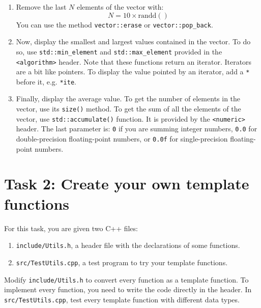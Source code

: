 \begin{enumerate}
\item Remove the last $N$ elements of the vector with:
$$
	N = 10 \times \mathrm{randd()}
$$
You can use the method \verb+vector::erase+ or \verb+vector::pop_back+. 

\item Now, display the smallest and largest values contained in the vector. To do so, use \verb+std::min_element+ and \verb+std::max_element+ provided in the \verb+<algorithm>+ header. Note that these functions return an iterator. Iterators are a bit like pointers. To display the value pointed by an iterator, add a \verb+*+ before it, e.g. \verb+*ite+.

\item Finally, display the average value. 
To get the number of elements in the vector, use its \verb+size()+ method. 
To get the sum of all the elements of the vector, use \verb+std::accumulate()+ function. 
It is provided by the \verb+<numeric>+ header. 
The last parameter is:
\verb+0+ if you are summing integer numbers,
\verb+0.0+ for double-precision floating-point numbers, or 
\verb+0.0f+ for single-precision floating-point numbers.
\end{enumerate}

\section*{Task 2: Create your own template functions}

For this task, you are given two C++ files:
\begin{enumerate}
  \item \verb+include/Utils.h+, a header file with the declarations of some functions.
  \item \verb+src/TestUtils.cpp+, a test program to try your template functions.
\end{enumerate}

Modify \verb+include/Utils.h+ to convert every function as a template function. 
To implement every function, you need to write the code directly in the header. 
In \verb+src/TestUtils.cpp+, test every template function with different data types.


